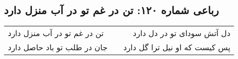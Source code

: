 \begin{center}
\section*{رباعی شماره ۱۲۰: تن در غم تو در آب منزل دارد}
\label{sec:sh120}
\begin{longtable}{l p{0.5cm} r}
تن در غم تو در آب منزل دارد
&&
دل آتش سودای تو در دل دارد
\\
جان در طلب تو باد حاصل دارد
&&
پس کیست که او نیل ترا گل دارد
\\
\end{longtable}
\end{center}
